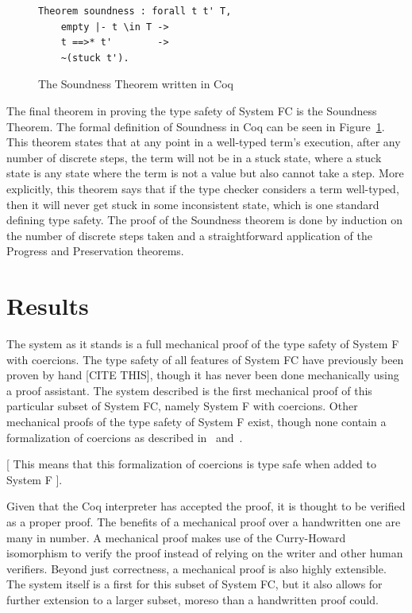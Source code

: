 \documentclass{sig-alternate}
\begin{document}
\begin{figure}[h!]
\begin{lstlisting}
Theorem soundness : forall t t' T,
    empty |- t \in T ->
    t ==>* t'        ->
    ~(stuck t').
\end{lstlisting}
\caption{The Soundness Theorem written in Coq}
\label{fig:soundness-coq}
\end{figure}

The final theorem in proving the type safety of System FC is the Soundness Theorem. The formal definition of Soundness in Coq can be seen in Figure~\ref{fig:soundness-coq}. This theorem states that at any point in a well-typed term's execution, after any number of discrete steps, the term will not be in a stuck state, where a stuck state is any state where the term is not a value but also cannot take a step. More explicitly, this theorem says that if the type checker considers a term well-typed, then it will never get stuck in some inconsistent state, which is one standard defining type safety. The proof of the Soundness theorem is done by induction on the number of discrete steps taken and a straightforward application of the Progress and Preservation theorems.

\section{Results}
\label{sec:results}

The system as it stands is a full mechanical proof of the type safety of System F with coercions. The type safety of all features of System FC have previously been proven by hand [CITE THIS], though it has never been done mechanically using a proof assistant. The system described is the first mechanical proof of this particular subset of System FC, namely System F with coercions. Other mechanical proofs of the type safety of System F exist, though none contain a formalization of coercions as described in~\cite{Breitner:2014:SZC:2628136.2628141} and~\cite{DBLP:conf/tldi/YorgeyWCJVM12}.

[ This means that this formalization of coercions is type safe when added to System F ].

Given that the Coq interpreter has accepted the proof, it is thought to be verified as a proper proof. The benefits of a mechanical proof over a handwritten one are many in number. A mechanical proof makes use of the Curry-Howard isomorphism to verify the proof instead of relying on the writer and other human verifiers. Beyond just correctness, a mechanical proof is also highly extensible. The system itself is a first for this subset of System FC, but it also allows for further extension to a larger subset, moreso than a handwritten proof could. 
\end{document}
